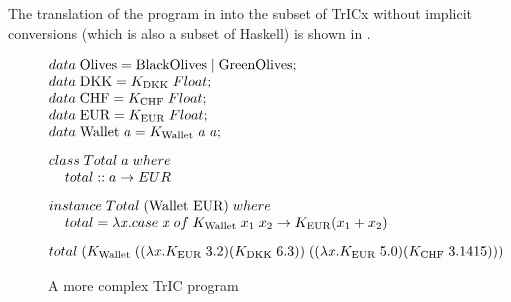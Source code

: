 The translation of the program in  into the subset of TrICx without implicit conversions (which is also a subset of Haskell) is shown in .
\begin{figure}
     \[
\begin{array}{@{\hspace{0mm}}l@{\hspace{0mm}}}
  data\;\text{Olives}=\text{BlackOlives}\;|\;\text{GreenOlives};\\
  data\;\text{DKK}=K_{\text{DKK}}\; Float;\\
  data\;\text{CHF}=K_{\text{CHF}}\; Float;\\
  data\;\text{EUR}=K_{\text{EUR}}\; Float;\\
  data\;\text{Wallet}\;\tyVar=K_{\text{Wallet}}\; \tyVar \; \tyVar;\\[3mm]
  class\;Total\;a\;where\\\phantom{xx}total :: a \to EUR \\[3mm]
  instance\;Total\;(\text{Wallet EUR})\;where\\\phantom{xx} total=\lambda \tmVar. case\;\tmVar\; of\;K_{\text{Wallet}}\;x_1\;x_2 \to K_{\text{EUR}} (x_1+x_2)\\[3mm]
  
  total\; (K_{\text{Wallet}}\;((\lambda \tmVar . K_{\text{EUR}}\;3.2)(K_{\text{DKK}}\;6.3))\; ((\lambda \tmVar . K_{\text{EUR}}\;5.0)(K_{\text{CHF}}\;3.1415)))
  
\end{array}
\]
\caption{A more complex TrIC program}
\label{hm7}
\end{figure}

